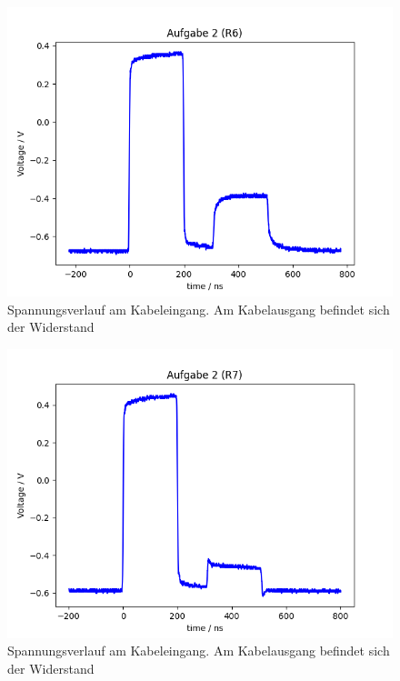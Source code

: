 \documentclass{article}
\begin{document}
\begin{figure}[H]
\centering
\caption{Spannungsverlauf am Kabeleingang. Am Kabelausgang befindet sich der Widerstand }
\label{fig:task2_R6}
\includegraphics[scale=0.6]{bilder/task2/task2_R6.png}
\end{figure}




\begin{figure}[H]
\centering
\caption{Spannungsverlauf am Kabeleingang. Am Kabelausgang befindet sich der Widerstand }
\label{fig:task2_R7}
\includegraphics[scale=0.6]{bilder/task2/task2_R7.png}
\end{figure}
\end{document}
